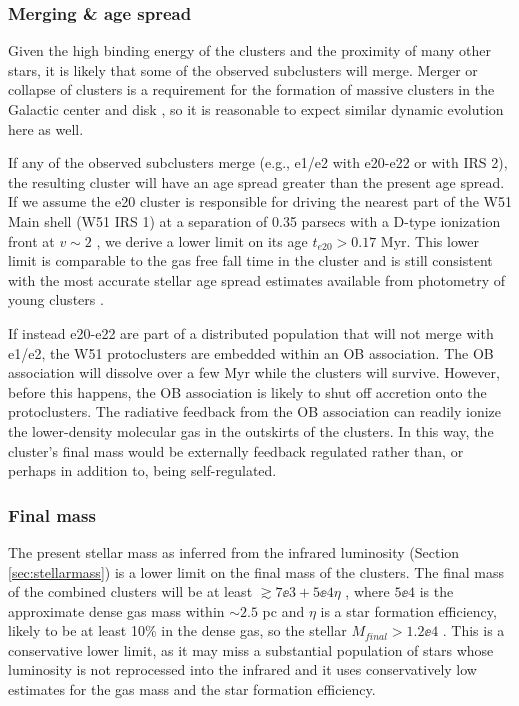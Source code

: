 \subsubsection{Merging \& age spread}
\label{sec:merging}
Given the high binding energy of the clusters and the proximity of many other
stars, it is likely that some of the observed subclusters will merge.  Merger
or collapse of clusters is a requirement for the formation of massive
clusters in the Galactic center and disk \citep{Walker2015a,Walker2016a}, so it is reasonable to
expect similar dynamic evolution here as well.

If any of the observed subclusters merge (e.g., e1/e2 with e20-e22 or with
IRS 2), the
resulting cluster will have an age spread greater than the present
age spread.  If we assume the e20 cluster is responsible for driving the
nearest part of the W51 Main shell (W51 IRS 1) at a separation of 0.35 parsecs with a
D-type ionization front at $v\sim2$ \kms, we derive a lower limit on its age
$t_{e20} > 0.17$ Myr.  This lower limit is comparable to the gas free fall time
in the cluster and is still consistent with the most accurate stellar age
spread estimates available from photometry of young clusters
\citep[e.g.,][]{Kudryavtseva2012a}.

If instead e20-e22 are part of a distributed population that will not merge
with e1/e2, the W51 protoclusters are embedded within an OB association.  The
OB association will dissolve over a few Myr while the clusters will survive.
However, before this happens, the OB association is likely to shut off
accretion onto the protoclusters.  The radiative feedback from the OB
association can readily ionize the lower-density molecular gas in the outskirts
of the clusters.  In this way, the cluster's final mass would be externally
feedback regulated rather than, or perhaps in addition to, being
self-regulated.



\subsubsection{Final mass}
The present stellar mass as inferred from the infrared luminosity (Section
\ref{sec:stellarmass}) is a lower limit on the final mass of the clusters.  The
final mass of the combined clusters will be at least $\gtrsim7\ee{3} + 5\ee{4} \eta$ \msun,
where $5\ee{4}$ \msun is the approximate dense gas mass within $\sim2.5$ pc and
$\eta$ is a star formation efficiency, likely to be at least 10\% in the dense
gas, so the stellar $M_{final} > 1.2\ee{4}$ \msun.  This is a conservative lower
limit, as it may miss a substantial population of stars whose luminosity is not
reprocessed into the infrared and it uses conservatively low estimates for the 
gas mass and the star formation efficiency.

